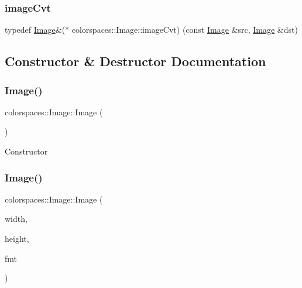 \mbox{\label{classcolorspaces_1_1_image_a8d8b6c8b517caac4cb685f4d73e2c8dc}} 
\subsubsection{\texorpdfstring{image\+Cvt}{imageCvt}}
{\footnotesize\ttfamily typedef \hyperlink{classcolorspaces_1_1_image}{Image}\&($\ast$ colorspaces\+::\+Image\+::image\+Cvt) (const \hyperlink{classcolorspaces_1_1_image}{Image} \&src, \hyperlink{classcolorspaces_1_1_image}{Image} \&dst)}



\subsection{Constructor \& Destructor Documentation}
\mbox{\label{classcolorspaces_1_1_image_ac5cf4664b2cd2c67bb83624c14d92b5f}} 
\subsubsection{\texorpdfstring{Image()}{Image()}\hspace{0.1cm}{\footnotesize\ttfamily [1/5]}}
{\footnotesize\ttfamily colorspaces\+::\+Image\+::\+Image (\begin{DoxyParamCaption}{ }\end{DoxyParamCaption})}

Constructor \mbox{\label{classcolorspaces_1_1_image_a814ba81329dd867cc29ad784cb99e533}} 
\subsubsection{\texorpdfstring{Image()}{Image()}\hspace{0.1cm}{\footnotesize\ttfamily [2/5]}}
{\footnotesize\ttfamily colorspaces\+::\+Image\+::\+Image (\begin{DoxyParamCaption}\item[{const int}]{width,  }\item[{const int}]{height,  }\item[{const \hyperlink{classcolorspaces_1_1_image_ab3978cc7acc2b5e855f8c715f09667d1}{Format\+Ptr}}]{fmt }\end{DoxyParamCaption})}


